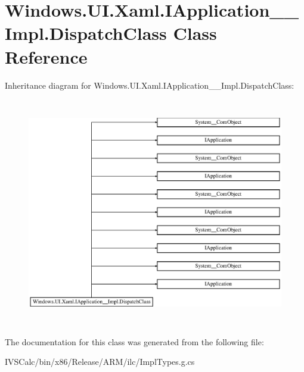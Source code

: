 \hypertarget{class_windows_1_1_u_i_1_1_xaml_1_1_i_application_____impl_1_1_dispatch_class}{}\section{Windows.\+U\+I.\+Xaml.\+I\+Application\+\_\+\+\_\+\+Impl.\+Dispatch\+Class Class Reference}
\label{class_windows_1_1_u_i_1_1_xaml_1_1_i_application_____impl_1_1_dispatch_class}
Inheritance diagram for Windows.\+U\+I.\+Xaml.\+I\+Application\+\_\+\+\_\+\+Impl.\+Dispatch\+Class\+:\begin{figure}[H]
\begin{center}
\leavevmode
\includegraphics[height=10.032573cm]{class_windows_1_1_u_i_1_1_xaml_1_1_i_application_____impl_1_1_dispatch_class}
\end{center}
\end{figure}


The documentation for this class was generated from the following file\+:\begin{DoxyCompactItemize}
\item 
I\+V\+S\+Calc/bin/x86/\+Release/\+A\+R\+M/ilc/Impl\+Types.\+g.\+cs\end{DoxyCompactItemize}
